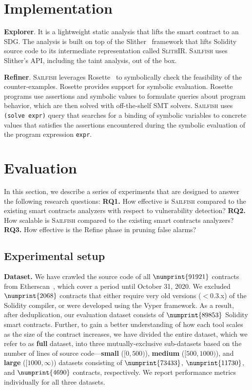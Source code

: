 \documentclass[conference, romanappendices]{tex/IEEEtran}
\theoremstyle{bfnote}
\newcommand{\toolname}{\textsc{Sailfish}\xspace}
\newcommand{\rosette}{{\sc Rosette}\xspace}
\newcommand{\refine}{{\sc Refine}\xspace}
\newcommand{\slither}{{\sc Slither}\xspace}
\newcommand{\solidity}{{\sc Solidity}\xspace}
\newcommand{\vyper}{{\sc Vyper}\xspace}
\newcommand{\smart}{smart contract}
\let\num\numprint
\newcommand{\contractsCrawled}{91921}
\newcommand{\contractsExcluded}{2068}
\newcommand{\dataset}{89853}
\newcommand{\smallDataset}{73433}
\newcommand{\mediumDataset}{11730}
\newcommand{\largeDataset}{4690}
\begin{document}
 	\section{Implementation}
\label{implementation}

\noindent
\textbf{Explorer}. It is a lightweight static analysis that lifts the \smart{} to an SDG. 
The analysis is built on top of the \slither~\cite{slither} framework that lifts \solidity{} source code to its intermediate representation called \textsc{SlithIR}.
\toolname uses \slither's API, including the taint analysis, out of the box.

	
	
	
	

\noindent
\textbf{Refiner}.
\toolname leverages \rosette~\cite{rosette} to symbolically check the feasibility of the counter-examples.
\rosette provides support for symbolic evaluation.
\rosette programs use assertions and symbolic values to formulate queries about program behavior, which are then solved with off-the-shelf SMT solvers.
\toolname uses \texttt{(solve expr)} query that searches for a binding of symbolic variables to concrete values that satisfies the assertions encountered during the symbolic evaluation of the program expression \texttt{expr}.
 	\section{Evaluation}
\label{evaluation}
In this section, we describe a series of experiments that are designed to answer the following research questions:
\textbf{RQ1.} How effective is \toolname compared to the existing smart contracts analyzers with respect to vulnerability detection?
\textbf{RQ2.} How scalable is \toolname compared to the existing smart contracts analyzers?
\textbf{RQ3.} How effective is the \refine phase in pruning false alarms?

\subsection{Experimental setup}
\vspace{-1mm}
\noindent
\textbf{Dataset.}
We have {crawled\EndAccSupp{}} the source code of all $\num{\contractsCrawled}$ contracts from Etherscan~\cite{etherscan}, which cover a period until October 31, 2020.
We excluded $\num{\contractsExcluded}$ contracts that either require very old versions ($<$0.3.x) of the \solidity{} compiler, or were developed using the \vyper{} framework. 
As a result, after deduplication, our evaluation dataset consists of $\num{\dataset}$ \solidity{} \smart s.
Further, to gain a better understanding of how each tool scales as the size of the contract increases, we have divided the entire dataset, which we refer to as \textbf{full} dataset, into three mutually-exclusive sub-datasets based on the number of lines of source code---\textbf{small} ($[0, 500)$), \textbf{medium} ($[500, 1000)$), and \textbf{large} ($[1000, \infty)$) datasets consisting of $\num{\smallDataset}$, $\num{\mediumDataset}$, and $\num{\largeDataset}$ contracts, respectively.
We report performance metrics individually for all three datasets.
\end{document}

